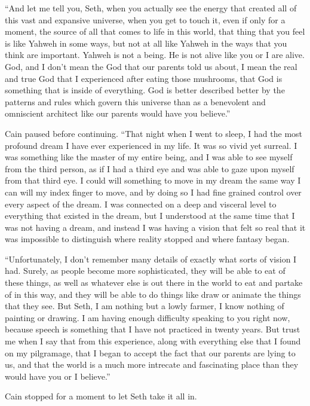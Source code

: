 \documentclass[12pt,twoside,titlepage]{report}
\begin{document}
``And let me tell you, Seth, when you actually see the energy that
created all of this vast and expansive universe, when you get to touch
it, even if only for a moment, the source of all that comes to life in
this world, that thing that you feel is like Yahweh in some ways, but
not at all like Yahweh in the ways that you think are important. Yahweh
is not a being. He is not alive like you or I are alive. God, and I
don't mean the God that our parents told us about, I mean the real and
true God that I experienced after eating those mushrooms, that God is
something that is inside of everything. God is better described better
by the patterns and rules which govern this universe than as a
benevolent and omniscient architect like our parents would have you
believe.''

Cain paused before continuing. ``That night when I went to sleep, I had
the most profound dream I have ever experienced in my life. It was so
vivid yet surreal. I was something like the master of my entire being,
and I was able to see myself from the third person, as if I had a third
eye and was able to gaze upon myself from that third eye. I could will
something to move in my dream the same way I can will my index finger to
move, and by doing so I had fine grained control over every aspect of
the dream. I was connected on a deep and visceral level to everything
that existed in the dream, but I understood at the same time that I was
not having a dream, and instead I was having a vision that felt so real
that it was impossible to distinguish where reality stopped and where
fantasy began.

``Unfortunately, I don't remember many details of exactly what sorts of
vision I had. Surely, as people become more sophisticated, they will be
able to eat of these things, as well as whatever else is out there in
the world to eat and partake of in this way, and they will be able to do
things like draw or animate the things that they see. But Seth, I am
nothing but a lowly farmer, I know nothing of painting or drawing. I am
having enough difficulty speaking to you right now, because speech is
something that I have not practiced in twenty years. But trust me when I
say that from this experience, along with everything else that I found
on my pilgramage, that I began to accept the fact that our parents are
lying to us, and that the world is a much more intrecate and fascinating
place than they would have you or I believe.''

Cain stopped for a moment to let Seth take it all in.
\end{document}
